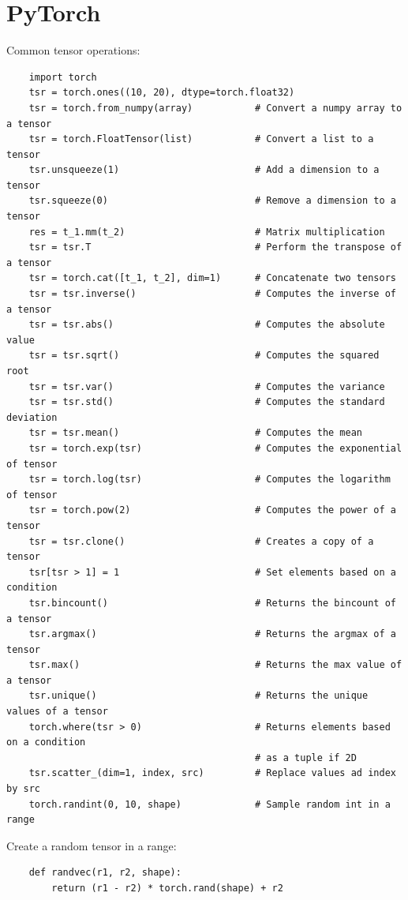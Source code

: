 \documentclass[12pt]{report}
\begin{document}
    \section{PyTorch}
        Common tensor operations:
        \begin{verbatim}
    import torch
    tsr = torch.ones((10, 20), dtype=torch.float32)
    tsr = torch.from_numpy(array)           # Convert a numpy array to a tensor
    tsr = torch.FloatTensor(list)           # Convert a list to a tensor
    tsr.unsqueeze(1)                        # Add a dimension to a tensor
    tsr.squeeze(0)                          # Remove a dimension to a tensor
    res = t_1.mm(t_2)                       # Matrix multiplication
    tsr = tsr.T                             # Perform the transpose of a tensor
    tsr = torch.cat([t_1, t_2], dim=1)      # Concatenate two tensors
    tsr = tsr.inverse()                     # Computes the inverse of a tensor
    tsr = tsr.abs()                         # Computes the absolute value
    tsr = tsr.sqrt()                        # Computes the squared root
    tsr = tsr.var()                         # Computes the variance
    tsr = tsr.std()                         # Computes the standard deviation
    tsr = tsr.mean()                        # Computes the mean
    tsr = torch.exp(tsr)                    # Computes the exponential of tensor
    tsr = torch.log(tsr)                    # Computes the logarithm of tensor
    tsr = torch.pow(2)                      # Computes the power of a tensor
    tsr = tsr.clone()                       # Creates a copy of a tensor
    tsr[tsr > 1] = 1                        # Set elements based on a condition
    tsr.bincount()                          # Returns the bincount of a tensor
    tsr.argmax()                            # Returns the argmax of a tensor
    tsr.max()                               # Returns the max value of a tensor
    tsr.unique()                            # Returns the unique values of a tensor
    torch.where(tsr > 0)                    # Returns elements based on a condition
                                            # as a tuple if 2D
    tsr.scatter_(dim=1, index, src)         # Replace values ad index by src
    torch.randint(0, 10, shape)             # Sample random int in a range
        \end{verbatim}
        
        Create a random tensor in a range:
        \begin{verbatim}
    def randvec(r1, r2, shape):
        return (r1 - r2) * torch.rand(shape) + r2
        \end{verbatim}
        
\end{document}
